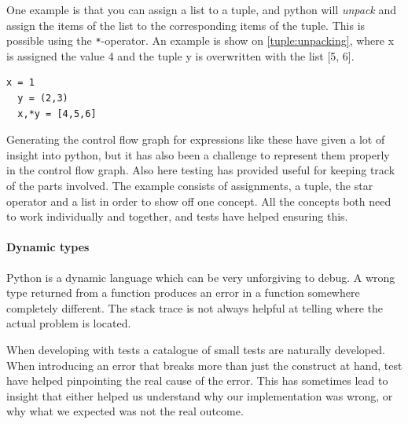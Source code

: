 One example is that you can assign a list to a tuple, and python will \emph{unpack} and assign the items of the list to the corresponding items of the tuple.
This is possible using the \texttt{*}-operator.
An example is show on \cref{tuple:unpacking}, where x is assigned the value 4 and the tuple y is overwritten with the list [5, 6].
\begin{lstlisting}[style=python, caption={Tuple unpacking}, label=tuple:unpacking]
  x = 1
  y = (2,3)
  x,*y = [4,5,6]
\end{lstlisting}

Generating the control flow graph for expressions like these have given a lot of insight into python, but it has also been a challenge to represent them properly in the control flow graph.
Also here testing has provided useful for keeping track of the parts involved.
The example consists of assignments, a tuple, the star operator and a list in order to show off one concept.
All the concepts both need to work individually and together, and tests have helped ensuring this.

\paragraph{Dynamic types}
Python is a dynamic language which can be very unforgiving to debug.
A wrong type returned from a function produces an error in a function somewhere completely different.
The stack trace is not always helpful at telling where the actual problem is located.

When developing with tests a catalogue of small tests are naturally developed.
When introducing an error that breaks more than just the construct at hand, test have helped pinpointing the real cause of the error.
This has sometimes lead to insight that either helped us understand why our implementation was wrong, or why what we expected was not the real outcome.
